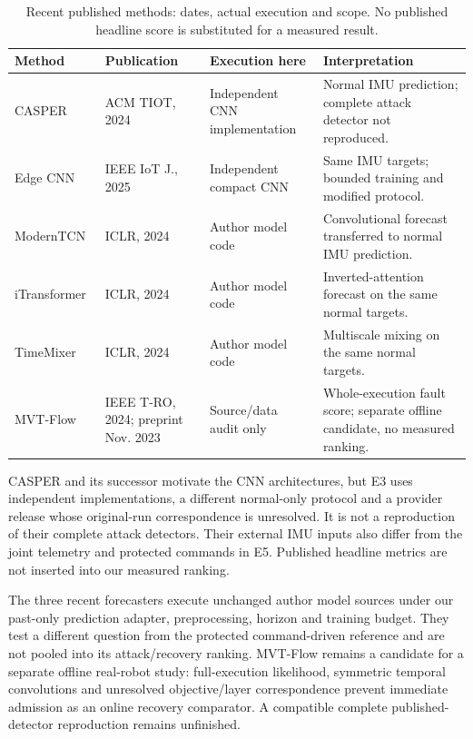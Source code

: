 \begin{table}[t]\centering
\caption{Recent published methods: dates, actual execution and scope. No published headline score is substituted for a measured result.}\label{tab:recent}
\begin{tabular}{>{\raggedright\arraybackslash}p{}>{\raggedright\arraybackslash}p{}>{\raggedright\arraybackslash}p{}>{\raggedright\arraybackslash}p{}}\toprule
Method & Publication & Execution here & Interpretation\\\midrule
CASPER~\cite{casper} & ACM TIOT, 2024 & Independent CNN implementation & Normal IMU prediction; complete attack detector not reproduced.\\
Edge CNN~\cite{edge} & IEEE IoT J., 2025 & Independent compact CNN & Same IMU targets; bounded training and modified protocol.\\
ModernTCN~\cite{moderntcn} & ICLR, 2024 & Author model code & Convolutional forecast transferred to normal IMU prediction.\\
iTransformer~\cite{itransformer} & ICLR, 2024 & Author model code & Inverted-attention forecast on the same normal targets.\\
TimeMixer~\cite{timemixer} & ICLR, 2024 & Author model code & Multiscale mixing on the same normal targets.\\
MVT-Flow~\cite{voraus} & IEEE T-RO, 2024; preprint Nov. 2023 & Source/data audit only & Whole-execution fault score; separate offline candidate, no measured ranking.\\\bottomrule
\end{tabular}
\end{table}

CASPER and its successor motivate the CNN architectures, but E3 uses independent implementations, a different normal-only protocol and a provider release whose original-run correspondence is unresolved. It is not a reproduction of their complete attack detectors. Their external IMU inputs also differ from the joint telemetry and protected commands in E5. Published headline metrics are not inserted into our measured ranking.

The three recent forecasters execute unchanged author model sources under our past-only prediction adapter, preprocessing, horizon and training budget. They test a different question from the protected command-driven reference and are not pooled into its attack/recovery ranking. MVT-Flow remains a candidate for a separate offline real-robot study: full-execution likelihood, symmetric temporal convolutions and unresolved objective/layer correspondence prevent immediate admission as an online recovery comparator. A compatible complete published-detector reproduction remains unfinished.

